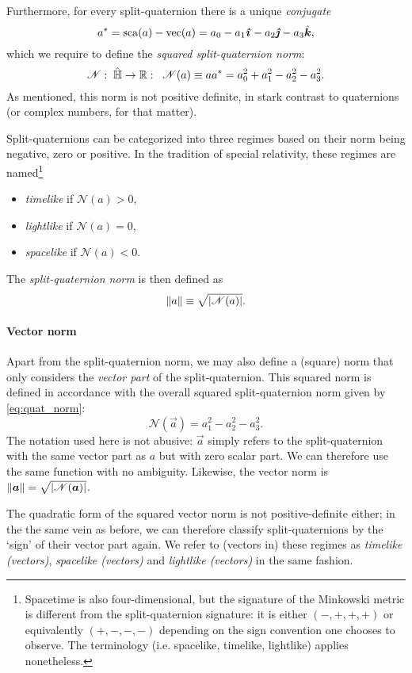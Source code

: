 Furthermore, for every split-quaternion there is a unique \emph{conjugate}
$$ \conj{a} = \scapart{a} - \vecpart{a} = a_0 - a_1\quati - a_2\quatj - a_3\quatk, $$
which we require to define the \emph{squared split-quaternion norm}:
\begin{equation}
    \mathscr{N}:\;\hat{\mathbb{H}} \to \mathbb{R}:\;\;\mathscr{N}(a) \equiv aa^* = a_0^2 + a_1^2 - a_2^2 - a_3^2. 
    \label{eq:quat_norm}
\end{equation}
As mentioned, this norm is not positive definite, in stark contrast to quaternions (or complex numbers, for that matter). 

Split-quaternions can be categorized into three regimes based on their norm being negative, zero or positive. In the tradition of special relativity, these regimes are named\footnote
{Spacetime is also four-dimensional, but the signature of the Minkowski metric is different from the split-quaternion signature: it is either $(-, +, +, +)$ or equivalently $ (+, -, -, -)$ depending on the sign convention one chooses to observe. The terminology (i.e. spacelike, timelike, lightlike) applies nonetheless.} \cite{Misner1970,Landau1971}
\begin{itemize}
    \item \emph{timelike} if $ \mathscr{N}(a) > 0 $,
    \item \emph{lightlike} if $ \mathscr{N}(a) = 0 $, 
    \item \emph{spacelike} if $ \mathscr{N}(a) < 0 $.
\end{itemize}
The \emph{split-quaternion norm} is then defined as
$$ \norm{a} \equiv \sqrt{\abs{\mathscr{N}(a)}}. $$

\paragraph{Vector norm}
Apart from the split-quaternion norm, we may also define a (square) norm that only considers the \emph{vector part} of the split-quaternion. This squared norm is defined in accordance with the overall squared split-quaternion norm given by \cref{eq:quat_norm}:
$$ \mathscr{N}(\vec{a}) = a_1^2 - a^2_2 - a^2_3. $$
The notation used here is not abusive: $\vec{a}$ simply refers to the split-quaternion with the same vector part as $a$ but with zero scalar part. We can therefore use the same function with no ambiguity. Likewise, the vector norm is $ \norm{\vec{a}} = \sqrt{\abs{\mathscr{N}(\vec{a})}} $. 

The quadratic form of the squared vector norm is not positive-definite either; in the the same vein as before, we can therefore classify split-quaternions by the `sign' of their vector part again. We refer to (vectors in) these regimes as \emph{timelike (vectors)}, \emph{spacelike (vectors)} and \emph{lightlike (vectors)} in the same fashion. 

